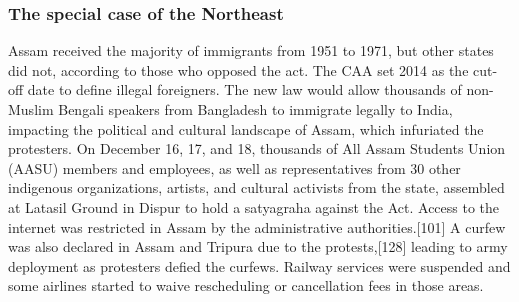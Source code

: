 \documentclass{article}
\begin{document}
\subsubsection{The special case of the Northeast}
Assam received the majority of immigrants from 1951 to 1971, but other states did not, according to those who opposed the act. The CAA set 2014 as the cut-off date to define illegal foreigners. The new law would allow thousands of non-Muslim Bengali speakers from Bangladesh to immigrate legally to India, impacting the political and cultural landscape of Assam, which infuriated the protesters. On December 16, 17, and 18, thousands of All Assam Students Union (AASU) members and employees, as well as representatives from 30 other indigenous organizations, artists, and cultural activists from the state, assembled at Latasil Ground in Dispur to hold a satyagraha against the Act.
Access to the internet was restricted in Assam by the administrative authorities.[101] A curfew was also declared in Assam and Tripura due to the protests,[128] leading to army deployment as protesters defied the curfews. Railway services were suspended and
some airlines started to waive rescheduling or cancellation fees in those areas.
\end{document}
